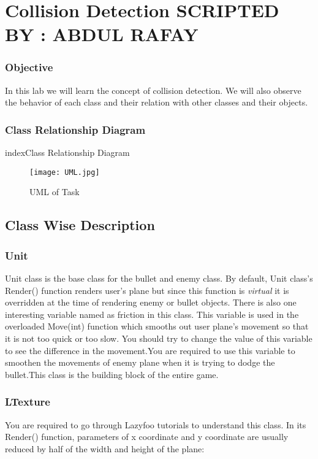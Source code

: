 \documentclass[11pt,fleqn]{book} %
\begin{document}
\newpage
{} %

\chapter{Collision Detection \hspace{38mm} {\textsc{\small SCRIPTED BY : ABDUL RAFAY}}}
\subsection{Objective}
In this lab we will learn the concept of collision detection. We will also observe the behavior of each class and their relation with other classes and their objects.
\subsection{Class Relationship Diagram}index{Class Relationship Diagram}
\begin{figure}[h]
  \centering\texttt{[image: UML.jpg]}
  \caption{UML of Task}
\end{figure}
\newpage
\section{Class Wise Description}
\subsection{Unit}
Unit class is the base class for the bullet and enemy class. By default, Unit class's Render() function renders user's plane but since this function is \emph{virtual} it is overridden at the time of rendering enemy or bullet objects. There is also one interesting variable named as friction in this class. This variable is used in the overloaded Move(int) function which smooths out user plane's movement so that it is not too quick or too slow. You should try to change the value of this variable to see the difference in the movement.You are required to use this variable to smoothen the movements of enemy plane when it is trying to dodge the bullet.This class is the building block of the entire game.
\subsection{LTexture}
You are required to go through Lazyfoo tutorials to understand this class.
In its Render() function, parameters of x coordinate and y coordinate are usually reduced by half of the width and height of the plane:\\
\end{document}
